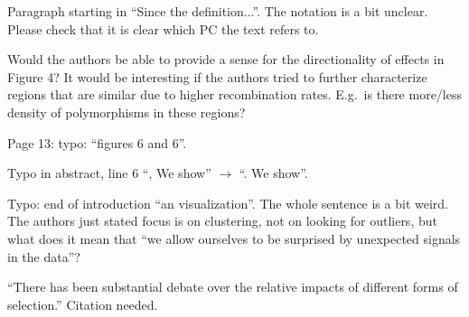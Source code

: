 
\begin{point}{}
Paragraph starting in ``Since the definition...''. The notation is a bit unclear. Please check that it
is clear which PC the text refers to.
\end{point}


\begin{point}{}
Would the authors be able to provide a sense for the directionality of effects in Figure 4? It
would be interesting if the authors tried to further characterize regions that are similar due to
higher recombination rates. E.g.\ is there more/less density of polymorphisms in these regions?
\end{point}


\begin{point}{Page 13:}
typo: ``figures 6 and 6''.
\end{point}


\begin{point}{}
Typo in abstract, line 6 ``, We show'' $\rightarrow$ ``. We show''.
\end{point}


\begin{point}{}
Typo: end of introduction ``an visualization''. The whole sentence is a bit weird. The authors just
stated focus is on clustering, not on looking for outliers, but what does it mean that ``we allow
ourselves to be surprised by unexpected signals in the data''?
\end{point}


\begin{point}{}
``There has been substantial debate over the relative impacts of different forms of selection.''
Citation needed.
\end{point}

